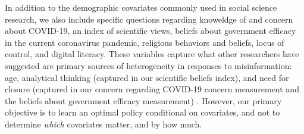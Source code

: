 \documentclass[letterpaper, 12pt, parskip=full,DIV=10]{scrartcl}
\begin{document}
In addition to the demographic covariates commonly used in social science research, we also include specific questions regarding knoweldge of and concern about COVID-19, an index of scientific views, beliefs about government efficacy in the current coronavirus pandemic, religious behaviors and beliefs, locus of control, and digital literacy. These variables capture what other researchers have suggested are primary sources of heterogeneity in responses to misinformation: age, analytical thinking (captured in our scientific beliefs index), and need for closure (captured in our concern regarding COVID-19 concern measurement and the beliefs about government efficacy measurement) \citep{wittenberg2020misinformation}. However, our primary objective is to learn an optimal policy conditional on covariates, and not to determine \textit{which} covariates matter, and by how much. %




\end{document}
